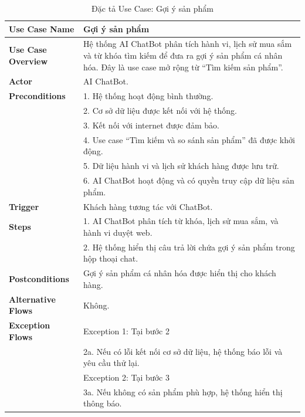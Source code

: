 {\begin{longtable}{|>{\bfseries}p{4cm}|p{11.5cm}|}
\caption{Đặc tả Use Case: Gợi ý sản phẩm}
\label{tab:uc-product-suggestion} \\
\hline
\textbf{Use Case Name} & Gợi ý sản phẩm \\
\hline
\textbf{Use Case Overview} & Hệ thống AI ChatBot phân tích hành vi, lịch sử mua sắm và từ khóa tìm kiếm để đưa ra gợi ý sản phẩm cá nhân hóa. Đây là use case mở rộng từ “Tìm kiếm sản phẩm”. \\
\hline
\textbf{Actor} & AI ChatBot. \\
\hline
\textbf{Preconditions} & 1. Hệ thống hoạt động bình thường. \\
& 2. Cơ sở dữ liệu được kết nối với hệ thống. \\
& 3. Kết nối với internet được đảm bảo. \\
& 4. Use case “Tìm kiếm và so sánh sản phẩm” đã được khởi động. \\
& 5. Dữ liệu hành vi và lịch sử khách hàng được lưu trữ. \\
& 6. AI ChatBot hoạt động và có quyền truy cập dữ liệu sản phẩm. \\
\hline
\textbf{Trigger} & Khách hàng tương tác với ChatBot. \\
\hline
\textbf{Steps} & 1. AI ChatBot phân tích từ khóa, lịch sử mua sắm, và hành vi duyệt web. \\
& 2. Hệ thống hiển thị câu trả lời chứa gợi ý sản phẩm trong hộp thoại chat. \\
\hline
\textbf{Postconditions} & Gợi ý sản phẩm cá nhân hóa được hiển thị cho khách hàng. \\
\hline
\textbf{Alternative Flows} & Không. \\
\hline
\textbf{Exception Flows} & Exception 1: Tại bước 2 \\
& 2a. Nếu có lỗi kết nối cơ sở dữ liệu, hệ thống báo lỗi và yêu cầu thử lại. \\
& Exception 2: Tại bước 3 \\
& 3a. Nếu không có sản phẩm phù hợp, hệ thống hiển thị thông báo. \\
\hline
\end{longtable}

}
